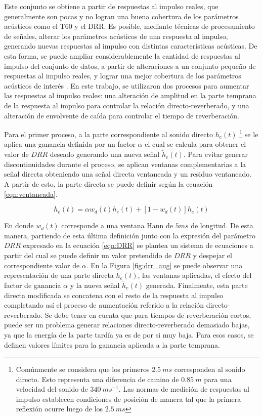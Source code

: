 Este conjunto se obtiene a partir de respuestas al impulso reales, que generalmente son pocas y no logran una buena cobertura de los parámetros acústicos como el T60 y el DRR. Es posible, mediante técnicas de procesamiento de señales, alterar los parámetros acústicos de una respuesta al impulso, generando nuevas respuestas al impulso con distintas características acústicas. De esta forma, se puede ampliar considerablemente la cantidad de respuestas al impulso del conjunto de datos, a partir de alteraciones a un conjunto pequeño de respuestas al impulso reales, y lograr una mejor cobertura de los parámetros acústicos de interés \cite{rir_aug}. En este trabajo, se utilizaron dos procesos para aumentar las respuestas al impulso reales: una alteración de amplitud en la parte temprana de la respuesta al impulso para controlar la relación directo-reverberado, y una alteración de envolvente de caída para controlar el tiempo de reverberación.



Para el primer proceso, a la parte correspondiente al sonido directo $h_{e}(t)$ \footnote{Comúnmente se considera que los primeros $2.5 \ ms$ corresponden al sonido directo. Esto representa una diferencia de camino de $0.85 \ m$ para una velocidad del sonido de $340 \ ms^{-1}$. Las normas de medición de respuestas al impulso establecen condiciones de posición de manera tal que la primera reflexión ocurre luego de los $2.5 \ ms$}  se le aplica una ganancia definida por un factor $\alpha$ el cual se calcula para obtener el valor de $DRR$ deseado generando una nueva señal $\tilde{h}_{e}(t)$. Para evitar generar discontinuidades durante el proceso, se aplican ventanas complementarias a la señal directa obteniendo una señal directa ventaneada y un residuo ventaneado. A partir de esto, la parte directa se puede definir según la ecuación
\ref{eqn:ventaneada}.  

\begin{equation}
\label{eqn:ventaneada}
	h_{e}(t) = \alpha w_{d}(t)h_{e}(t) + [1-w_{d}(t)]h_{e}(t)
\end{equation} 

En donde $w_{d}(t)$ corresponde a una ventana Hann de $5 ms$ de longitud. De esta manera, partiendo de esta última definición junto con la expresión del parámetro $DRR$ expresado en la ecuación \ref{eqn:DRR} se plantea un sistema de ecuaciones a partir del cual se puede definir un valor pretendido de $DRR$ y despejar el correspondiente valor de $\alpha$. En la Figura \ref{fig:drr_aug} se puede observar una representación de una parte directa $h_{e}(t)$, las ventanas aplicadas, el efecto del factor de ganancia $\alpha$ y la nueva señal $\tilde{h}_{e}(t)$ generada. Finalmente, esta parte directa modificada se concatena con el resto de la respuesta al impulso completando así el proceso de aumentación referido a la relación directo-reverberado. Se debe tener en cuenta que para tiempos de reverberación cortos, puede ser un problema generar relaciones directo-reverberado demasiado bajas, ya que la energía de la parte tardía ya es de por si muy baja. Para esos casos, se definen valores límites para la ganancia aplicada a la parte temprana.


